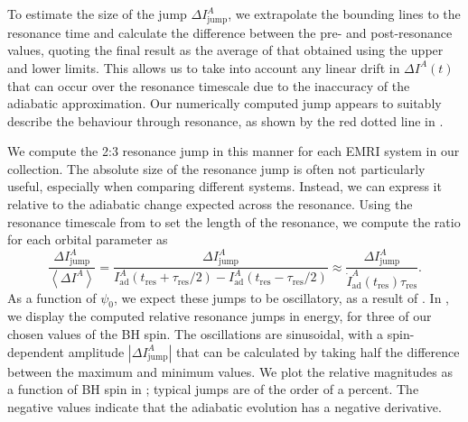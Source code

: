 To estimate the size of the jump $\Delta I^A_{\mathrm{jump}}$, we extrapolate the bounding lines to the resonance time and calculate the difference between the pre- and post-resonance values, quoting the final result as the average of that obtained using the upper and lower limits. This allows us to take into account any linear drift in $\Delta I^A(t)$ that can occur over the resonance timescale due to the inaccuracy of the adiabatic approximation. %
Our numerically computed jump appears to suitably describe the behaviour through resonance, as shown by the red dotted line in .

We compute the 2:3 resonance jump in this manner for each EMRI system in our collection. The absolute size of the resonance jump is often not particularly useful, especially when comparing different systems. Instead, we can express it relative to the adiabatic change expected across the resonance. Using the resonance timescale from  to set the length of the resonance, we compute the ratio for each orbital parameter as
\begin{equation}
\label{eq:res-jump-ratio}
\frac{\Delta I^A_\mathrm{jump}}{\left\langle\Delta I^A\right\rangle} = \frac{\Delta I^A_\mathrm{jump}}{I^A_\mathrm{ad}(t_\mathrm{res} + \tau_\mathrm{res}/2)-I^A_\mathrm{ad}(t_\mathrm{res} - \tau_\mathrm{res}/2)} \approx \frac{\Delta I^A_\mathrm{jump}}{\dot{I}^A_\mathrm{ad}(t_\mathrm{res})\tau_\mathrm{res}}.
\end{equation}
As a function of $\psi_0$, we expect these jumps to be oscillatory, as a result of . In , we display the computed relative resonance jumps in energy, for three of our chosen values of the BH spin. The oscillations are sinusoidal, with a spin-dependent amplitude $|\Delta I^A_\mathrm{jump}|$ that can be calculated by taking half the difference between the maximum and minimum values. %
We plot the relative magnitudes as a function of BH spin in ; typical jumps are of the order of a percent. The negative values indicate that the adiabatic evolution has a negative derivative.

